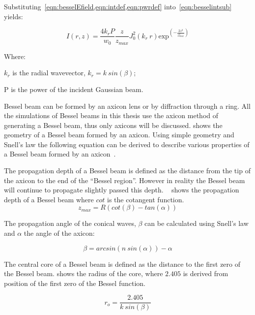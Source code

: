 Substituting~\cref{eqn:besselEfield,eqn:intdef,eqn:pwrdef} into~\cref{eqn:besselintsub} yields:

\begin{equation}
    I(r,z)=\frac{4k_rP}{w_0}\frac{z}{z_{max}}J_0^2\left(k_r\ r\right)\text{exp}^{\left(-\frac{2z^2}{z^2_{max}}\right)}
    \label{eqn:besselInt}
\end{equation}


\noindent Where:

    \indent $k_r$ is the radial wavevector, $k_r=k\ sin(\beta)$;

    \indent P is the power of the incident Gaussian beam.

    \medskip

Bessel beam can be formed by an axicon lens or by diffraction through a ring.
All the simulations of Bessel beams in this thesis use the axicon method of generating a Bessel beam, thus only axicons will be discussed.
 shows the geometry of a Bessel beam formed by an axicon.
Using simple geometry and Snell's law the following equation can be derived to describe various properties of a Bessel beam formed by an axicon~\cite{merola2012characterization,}.

The propagation depth of a Bessel beam is defined as the distance from the tip of the axicon to the end of the ``Bessel region''. However in reality the Bessel beam will continue to propagate slightly passed this depth.%
~ shows the propagation depth of a Bessel beam where $cot$ is the cotangent function.
\begin{equation}
z_{max}=R\left(cot\left(\beta\right) - tan\left(\alpha\right)\right)
\label{eqn:besselzmax}
\end{equation}

The propagation angle of the conical waves, $\beta$ can be calculated using Snell's law and $\alpha$ the angle of the axicon:

\begin{equation}
\beta = arcsin\left(n\ sin\left(\alpha\right)\right)-\alpha
\label{eqn:betaangle}
\end{equation}

The central core of a Bessel beam is defined as the distance to the first zero of the Bessel beam.
 shows the radius of the core, where $2.405$ is derived from position of the first zero of the Bessel function.

\begin{equation}
r_o = \frac{2.405}{k\ sin\left(\beta\right)}
\label{eqn:coreradius}
\end{equation}

